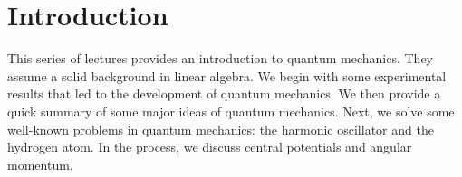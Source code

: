 \section{Introduction}
This series of lectures provides an introduction to quantum mechanics. They assume a solid background in linear algebra. We begin with some experimental results that led to the development of quantum mechanics. We then provide a quick summary of some major ideas of quantum mechanics. Next, we solve some well-known problems in quantum mechanics: the harmonic oscillator and the hydrogen atom. In the process, we discuss central potentials and angular momentum.
